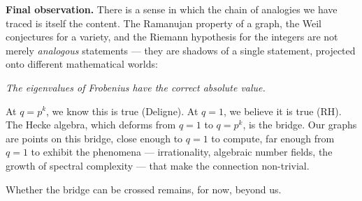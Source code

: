 \documentclass[11pt,a4paper]{article}
\theoremstyle{plain}
\theoremstyle{definition}
\begin{document}
\begin{tcolorbox}[breakable, colback=black!5, colframe=black!5,
  boxrule=0pt, sharp corners]
\textbf{Final observation.}
There is a sense in which the chain of analogies we have traced is
itself the content. The Ramanujan property of a graph, the Weil
conjectures for a variety, and the Riemann hypothesis for the integers
are not merely \emph{analogous} statements --- they are shadows of a
single statement, projected onto different mathematical worlds:

\medskip
\begin{center}
\emph{The eigenvalues of Frobenius have the correct absolute value.}
\end{center}

\medskip
At $q = p^k$, we know this is true (Deligne). At $q = 1$, we
believe it is true (RH). The Hecke algebra, which deforms from $q = 1$
to $q = p^k$, is the bridge. Our graphs are points on this bridge,
close enough to $q = 1$ to compute, far enough from $q = 1$ to
exhibit the phenomena --- irrationality, algebraic number fields,
the growth of spectral complexity --- that make the connection
non-trivial.

Whether the bridge can be crossed remains, for now, beyond us.
\end{tcolorbox}


\end{document}
